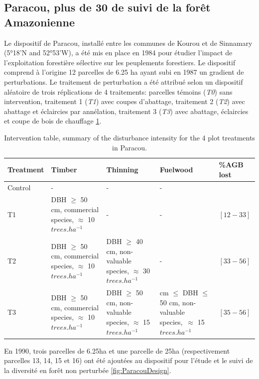 \documentclass[
  11pt,
  french,
  A4paper,
  extrafontsizes,onecolumn,openright
  ]{memoir}
\begin{document}
\subsection{Paracou, plus de 30 de suivi de la forêt
Amazonienne}\label{paracou-plus-de-30-de-suivi-de-la-foret-amazonienne}

Le dispositif de Paracou, installé entre les communes de Kourou et de
Sinnamary (5°18'N and 52°53'W), a été mis en place en 1984 pour étudier
l'impact de l'exploitation forestière sélective sur les peuplements
forestiers. Le dispositif comprend à l'origine 12 parcelles de 6.25 ha
ayant subi en 1987 un gradient de perturbations. Le traitement de
perturbation a été attribué selon un dispositif aléatoire de trois
réplications de 4 traitements: parcelles témoins (\emph{T0}) sans
intervention, traitement 1 (\emph{T1}) avec coupes d'abattage,
traitement 2 (\emph{T2}) avec abattage et éclaircies par annélation,
traitement 3 (\emph{T3}) avec abattage, éclaircies et coupe de bois de
chauffage \ref{tab:InterventionTable}.

\begingroup\fontsize{7}{9}\selectfont

\begin{longtable}[t]{>{\raggedright\arraybackslash}p{5em}|>{\raggedright\arraybackslash}p{8em}|>{\raggedright\arraybackslash}p{8em}|>{\raggedright\arraybackslash}p{11em}|>{\raggedright\arraybackslash}p{4em}}
\caption{\label{tab:InterventionTable}Intervention table, summary of the disturbance intensity for the 4 plot treatments in Paracou.}\\
\hline
Treatment & Timber & Thinning & Fuelwood & \%AGB lost\\
\hline
Control & - & - & - & 0\\
\hline
T1 & DBH $\geq$ 50 cm, commercial species, $\approx$ 10   $trees.ha^{-1}$ & - & - & $[12-33]$\\
\hline
T2 & DBH $\geq$ 50 cm, commercial species, $\approx$ 10  $trees.ha^{-1}$ & DBH $\geq$ 40 cm, non-valuable species, $\approx$ 30   $trees.ha^{-1}$ & - & $[33-56]$\\
\hline
T3 & DBH $\geq$ 50 cm, commercial species, $\approx$ 10  $trees.ha^{-1}$ & DBH $\geq$ 50 cm, non-valuable species, $\approx$ 15  $trees.ha^{-1}$ & 40 cm $\leq$ DBH $\leq$ 50 cm, non-valuable species,\ $\approx$ 15 $trees.ha^{-1}$ & $[35-56]$\\
\hline
\end{longtable}

\endgroup{}

En 1990, trois parcelles de 6.25ha et une parcelle de 25ha
(respectivement parcelles 13, 14, 15 et 16) ont été ajoutées au
dispositif pour l'étude et le suivi de la diversité en forêt non
perturbée \ref{fig:ParacouDesign}.
\end{document}
